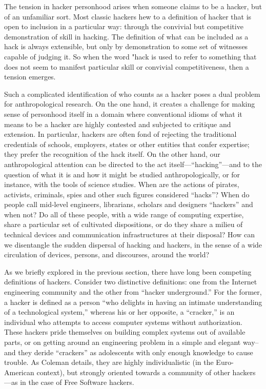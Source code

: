 \documentclass[10pt,letter,oneside]{scrartcl}
\begin{document}
The tension in hacker personhood arises when someone claims to be a hacker,
but of an unfamiliar sort.  Most classic hackers hew to a definition of hacker
that is open to inclusion in a particular way: through the convivial but
competitive demonstration of skill in hacking.  The definition of what can be
included as a hack is always extensible, but only by demonstration to some set
of witnesses capable of judging it.   So when the word "hack is used to refer
to something that does not seem to manifest particular skill or convivial
competitiveness, then a tension emerges. 

Such a complicated identification of who counts as a hacker poses a dual problem
for anthropological research.  On the one hand, it creates a challenge for
making sense of personhood itself in a domain where conventional idioms of what
it means to be a hacker are highly contested and subjected to critique and
extension.  In particular, hackers are often fond of rejecting the traditional
credentials of schools, employers, states or other entities that confer
expertise; they prefer the recognition of the hack itself. On the other hand,
our anthropological attention can be directed to the act
itself---``hacking''---and to the question of what it is and how it might be
studied anthropologically, or for instance, with the tools of science
studies. When are the actions of pirates, activists, criminals, spies and other
such figures considered ``hacks''?  When do people call mid-level engineers,
librarians, scholars and designers ``hackers'' and when not?  Do all of these
people, with a wide range of computing expertise, share a particular set of
cultivated dispositions, or do they share a milieu of technical devices and
communication infrastructures at their disposal?  How can we disentangle the
sudden dispersal of hacking and hackers, in the sense of a wide circulation of
devices, persons, and discourses, around the world?

As we briefly explored in the previous section, there have long been competing
definitions of hackers.  Consider two distinctive definitions: one from the
Internet engineering community and the other from ``hacker underground.''  For
the former, a hacker is defined as a person ``who delights in having an intimate
understanding of a technological system,'' whereas his or her opposite, a
``cracker,'' is an individual who attempts to access computer systems without
authorization.  These hackers pride themselves on building complex systems out
of available parts, or on getting around an engineering problem in a simple and
elegant way--and they deride ``crackers'' as adolescents with only enough
knowledge to cause trouble.  As Coleman \cite*{coleman_coding_2012} details,
they are highly individualistic (in the Euro-American context), but strongly
oriented towards a community of other hackers---as in the case of Free Software
hackers. 
\end{document}
